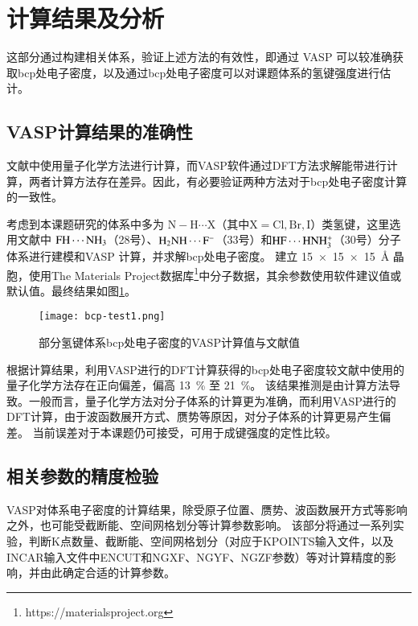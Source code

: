 \section{计算结果及分析}

这部分通过构建相关体系，验证上述方法的有效性，即通过 VASP 可以较准确获取bcp处电子密度，以及通过bcp处电子密度可以对课题体系的氢键强度进行估计。

\subsection{VASP计算结果的准确性}

文献\cite{emamianExploringNaturePredicting2019}中使用量子化学方法进行计算，而VASP软件通过DFT方法求解能带进行计算，两者计算方法存在差异。因此，有必要验证两种方法对于bcp处电子密度计算的一致性。

考虑到本课题研究的体系中多为 $\mathrm{N}-\mathrm{H}\cdots\mathrm{X}$（其中$\mathrm{X}=\mathrm{Cl,Br,I}$）类氢键，这里选用文献\cite{emamianExploringNaturePredicting2019}中 $\rm FH \cdots NH_3$（28号）、$\rm H_2NH \cdots F^-$（33号）和$\rm HF\cdots HNH_3^+$（30号）分子体系进行建模和VASP 计算，并求解bcp处电子密度。
建立 \SI{15x15x15}{\angstrom} 晶胞，使用The Materials Project数据库\footnote{https://materialsproject.org}中分子数据，其余参数使用软件建议值或默认值。最终结果如图\ref{fig:bcp-test1}。

\begin{figure}[htbp]
    \centering
    \texttt{[image: bcp-test1.png]}
    \caption{部分氢键体系bcp处电子密度的VASP计算值与文献值}
    \label{fig:bcp-test1}
\end{figure}

根据计算结果，利用VASP进行的DFT计算获得的bcp处电子密度较文献\cite{emamianExploringNaturePredicting2019}中使用的量子化学方法存在正向偏差，偏高 \SI{13}{\percent} 至 \SI{21}{\percent}。
该结果推测是由计算方法导致。一般而言，量子化学方法对分子体系的计算更为准确，而利用VASP进行的DFT计算，由于波函数展开方式、赝势等原因，对分子体系的计算更易产生偏差。
当前误差对于本课题仍可接受，可用于成键强度的定性比较。

\subsection{相关参数的精度检验}

VASP对体系电子密度的计算结果，除受原子位置、赝势、波函数展开方式等影响之外，也可能受截断能、空间网格划分等计算参数影响。
该部分将通过一系列实验，判断K点数量、截断能、空间网格划分（对应于KPOINTS输入文件，以及INCAR输入文件中ENCUT和NGXF、NGYF、NGZF参数）等对计算精度的影响，并由此确定合适的计算参数。

